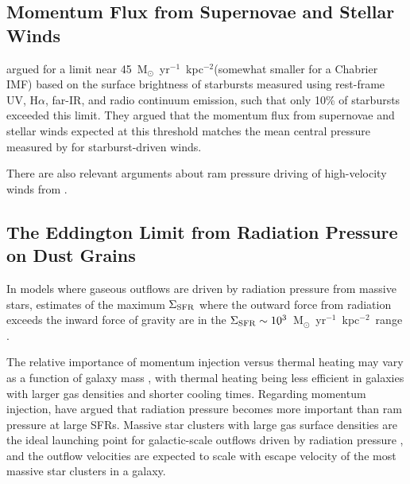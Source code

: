 \documentclass[apj]{emulateapj}
\newcommand{\units}{M$_{\odot}$~yr$^{-1}$~kpc$^{-2}$}
\newcommand{\sigmasfr}{\Sigma_{\textnormal{\scriptsize{SFR}}}}
\begin{document}


\subsection{Momentum Flux from Supernovae and Stellar Winds}

\citet{meu97} argued for a limit near 45~\units (somewhat smaller for
a Chabrier IMF) based on the surface brightness of starbursts measured
using rest-frame UV, H$\alpha$, far-IR, and radio continuum emission,
such that only 10\% of starbursts exceeded this limit.  They argued
that the momentum flux from supernovae and stellar winds expected at
this threshold matches the mean central pressure measured by
\citet{hec90} for starburst-driven winds.

There are also relevant arguments about ram pressure driving of
high-velocity winds from \citet{hec11}.


\subsection{The Eddington Limit from Radiation Pressure on Dust Grains}

In models where gaseous outflows are driven by radiation pressure from
massive stars, estimates of the maximum $\sigmasfr$ where the outward
force from radiation exceeds the inward force of gravity are in the
$\sigmasfr\sim10^3$~\units\ range \citep[e.g.,][]{tho05,hop10}.


The relative importance of momentum injection versus thermal heating
may vary as a function of galaxy mass \citep[e.g.,][]{hop12}, with
thermal heating being less efficient in galaxies with larger gas
densities and shorter cooling times.  Regarding momentum injection,
\citet{sha11} have argued that radiation pressure becomes more
important than ram pressure at large SFRs.  Massive star clusters with
large gas surface densities are the ideal launching point for
galactic-scale outflows driven by radiation pressure
\citep[e.g.,][]{mur11}, and the outflow velocities are expected to
scale with escape velocity of the most massive star clusters in a
galaxy.
\end{document}

